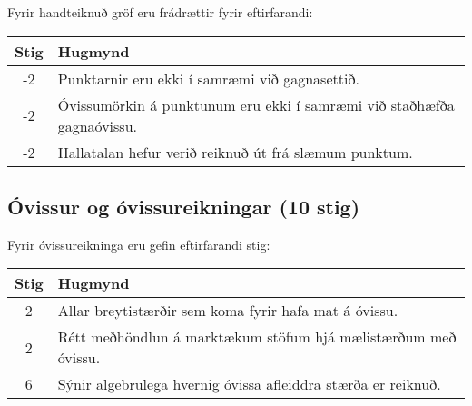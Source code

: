 \begin{tcolorbox}
Fyrir handteiknuð gröf eru frádrættir fyrir eftirfarandi:


\begin{table}[H]
    \centering
    \begin{tabular}{|c|l|}
    \hline
       \textbf{Stig}  & \textbf{Hugmynd}   \\ \hline \hline
        -2  & Punktarnir eru ekki í samræmi við gagnasettið.
        \\\hline
        -2  & Óvissumörkin á punktunum eru ekki í samræmi við staðhæfða gagnaóvissu.
        \\\hline
        -2   & Hallatalan hefur verið reiknuð út frá slæmum punktum.
        \\\hline
    \end{tabular}
\end{table}

\subsection*{Óvissur og óvissureikningar (10 stig)}

Fyrir óvissureikninga eru gefin eftirfarandi stig:

\begin{table}[H]
    \centering
    \begin{tabular}{|c|l|}
    \hline
       \textbf{Stig}  & \textbf{Hugmynd}   \\ \hline \hline
        2  & Allar breytistærðir sem koma fyrir hafa mat á óvissu. \\ \hline
        2  & Rétt meðhöndlun á marktækum stöfum hjá mælistærðum með óvissu. \\ \hline
        6  & Sýnir algebrulega hvernig óvissa afleiddra stærða er reiknuð. \\ \hline
    \end{tabular}
\end{table}


\end{tcolorbox}

\newpage

